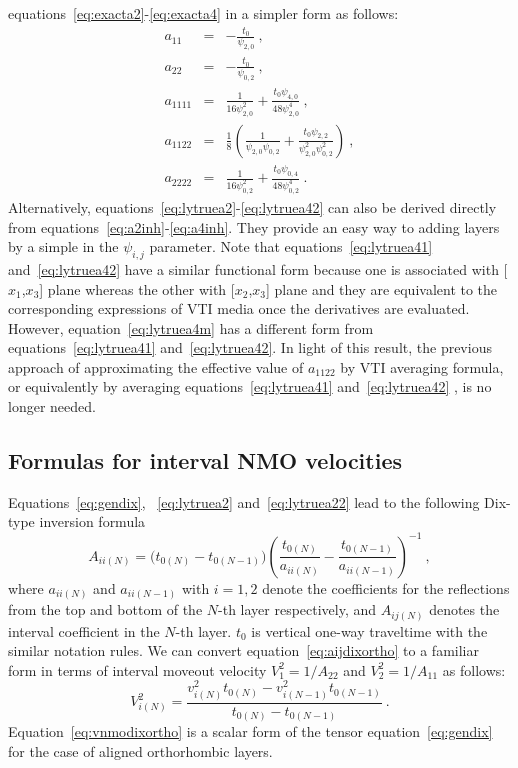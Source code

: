  equations~\ref{eq:exacta2}-\ref{eq:exacta4} in a simpler form as follows:
\begin{eqnarray}
\label{eq:lytruea2}
a_{11} & = & -\frac{t_0}{ \psi_{2,0}}~,\\
\label{eq:lytruea22}
a_{22} & = & -\frac{t_0}{\psi_{0,2}}~, \\
\label{eq:lytruea41}
a_{1111} & = & \frac{1}{16 \psi_{2,0}^2} + \frac{t_0 \psi_{4,0}}{48 \psi_{2,0}^4}~,\\
\label{eq:lytruea4m}
a_{1122} & = &  \frac{1}{8}\left(\frac{1}{\psi_{2,0}\psi_{0,2}} + \frac{t_0\psi_{2,2}}{\psi_{2,0}^2\psi_{0,2}^2}\right)~,\\
\label{eq:lytruea42}
a_{2222} & = & \frac{1}{16 \psi_{0,2}^2} + \frac{t_0 \psi_{0,4}}{48 \psi_{0,2}^4}~.
\end{eqnarray}
Alternatively, equations~\ref{eq:lytruea2}-\ref{eq:lytruea42} can also be derived directly from equations~\ref{eq:a2inh}-\ref{eq:a4inh}. They provide an easy way to adding layers by a simple  in the $\psi_{i,j}$ parameter. 
Note that equations~\ref{eq:lytruea41} and~\ref{eq:lytruea42} have a similar functional form because one is associated with [$x_1$,$x_3$] plane whereas the other with [$x_2$,$x_3$] plane and they are equivalent to the corresponding expressions of VTI media once the derivatives are evaluated. However, equation~\ref{eq:lytruea4m} has a different form from equations~\ref{eq:lytruea41} and~\ref{eq:lytruea42}. In light of this result, the previous approach of approximating the effective value of $a_{1122}$ by VTI averaging formula, or equivalently by averaging equations~\ref{eq:lytruea41} and~\ref{eq:lytruea42} \cite[]{alortho,vascon}, is no longer needed.

\subsection{Formulas for interval NMO velocities}

Equations~\ref{eq:gendix}, ~\ref{eq:lytruea2} and~\ref{eq:lytruea22} lead to the following Dix-type inversion formula
\begin{equation}
\label{eq:aijdixortho}
A_{ii(N)} = \bigg(t_{0(N)}-t_{0(N-1)}\bigg)\left(\frac{t_{0(N)}}{a_{ii(N)}}-\frac{t_{0(N-1)}}{a_{ii(N-1)}}\right)^{-1}~,
\end{equation}
where $a_{ii(N)}$ and $a_{ii(N-1)}$ with $i=1,2$ denote the coefficients for the reflections from the top and bottom of the $N$-th layer respectively, and $A_{ij(N)}$ denotes the interval coefficient in the $N$-th layer. $t_0$ is vertical one-way traveltime with the similar notation rules. We can convert equation~\ref{eq:aijdixortho} to a familiar form \cite[]{dix}  in terms of interval moveout velocity $V^2_1 = 1/A_{22}$ and $V^2_2 = 1/A_{11}$ as follows:
\begin{equation}
\label{eq:vnmodixortho}
V^2_{i(N)} =\frac{v^2_{i(N)}t_{0(N)}-v^2_{i(N-1)}t_{0(N-1)}}{t_{0(N)}-t_{0(N-1)}}~.
\end{equation}
Equation~\ref{eq:vnmodixortho} is a scalar form of the tensor equation~\ref{eq:gendix} for the  case of aligned orthorhombic layers.

